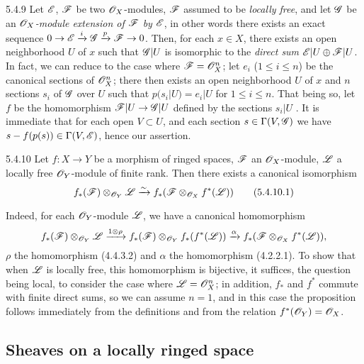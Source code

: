 \begin{env}{5.4.9}
\label{env-0.5.4.9}
Let $\mathscr{E}$, $\mathscr{F}$ be two $\mathscr{O}_X$-modules, $\mathscr{F}$ assumed to be
\emph{locally free}, and let $\mathscr{G}$ be an \emph{$\mathscr{O}_X$-module extension of
$\mathscr{F}$ by $\mathscr{E}$}, in other words there exists an exact sequence
$0\to\mathscr{E}\xrightarrow{i}\mathscr{G}\xrightarrow{p}\mathscr{F}\to 0$. Then, for each
$x\in X$, there exists an open neighborhood $U$ of $x$ such that $\mathscr{G}|U$ is
isomorphic to the \emph{direct sum $\mathscr{E}|U\oplus\mathscr{F}|U$}. In fact, we can
reduce to the case where $\mathscr{F}=\mathscr{O}_X^n$; let $e_i$ ($1\leqslant i\leqslant n$)
be the canonical sections  of $\mathscr{O}_X^n$; there then exists an
open neighborhood $U$ of $x$ and $n$ sections $s_i$ of $\mathscr{G}$ over $U$ such
that $p(s_i|U)=e_i|U$ for $1\leqslant i\leqslant n$. That being so, let $f$ be
the homomorphism $\mathscr{F}|U\to\mathscr{G}|U$ defined by the sections $s_i|U$
. It is immediate that for each open $V\subset U$, and each
section $s\in\Gamma(V,\mathscr{G})$ we have $s-f(p(s))\in\Gamma(V,\mathscr{E})$, hence our
assertion.
\end{env}

\begin{env}{5.4.10}
\label{env-0.5.4.10}
Let $f:X\to Y$ be a morphism of ringed spaces, $\mathscr{F}$ an $\mathscr{O}_X$-module,
$\mathscr{L}$ a locally free $\mathscr{O}_Y$-module of finite rank. Then there exists a
canonical isomorphism
\[
  f_*(\mathscr{F})\otimes_{\mathscr{O}_Y}\mathscr{L}\xrightarrow{\sim} f_*(\mathscr{F}\otimes_{\mathscr{O}_X}f^*(\mathscr{L}))
  \tag{5.4.10.1}
\]

Indeed, for each $\mathscr{O}_Y$-module $\mathscr{L}$, we have a canonical homomorphism
\[
  f_*(\mathscr{F})\otimes_{\mathscr{O}_Y}\mathscr{L}
  \xrightarrow{1\otimes\rho}f_*(\mathscr{F})\otimes_{\mathscr{O}_Y}f_*(f^*(\mathscr{L}))
  \xrightarrow{\alpha}f_*(\mathscr{F}\otimes_{\mathscr{O}_X}f^*(\mathscr{L})),
\]
$\rho$ the homomorphism (4.4.3.2) and $\alpha$ the homomorphism (4.2.2.1). To
show that when $\mathscr{L}$ is locally free, this homomorphism is bijective, it
suffices, the question being local, to consider the case where $\mathscr{L}=\mathscr{O}_X^n$;
in addition, $f_*$ and $f^*$ commute with finite direct sums, so we can assume
$n=1$, and in this case the proposition follows immediately from the definitions
and from the relation $f^*(\mathscr{O}_Y)=\mathscr{O}_X$.
\end{env}

\subsection{Sheaves on a locally ringed space}
\label{0-prelim-5.5}

